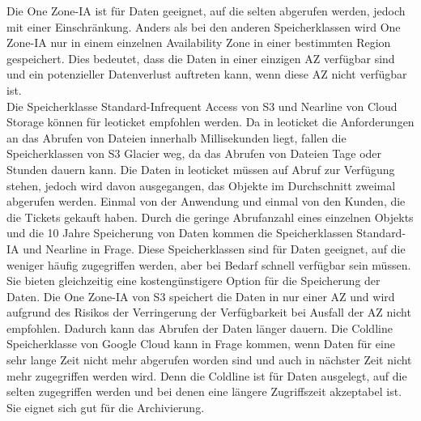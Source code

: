 Die One Zone-IA ist für Daten geeignet, auf die selten abgerufen werden, jedoch mit einer Einschränkung. Anders als bei den anderen Speicherklassen wird One Zone-IA nur in einem einzelnen Availability Zone in einer bestimmten Region gespeichert. Dies bedeutet, dass die Daten in einer einzigen AZ verfügbar sind und ein potenzieller Datenverlust auftreten kann, wenn diese AZ nicht verfügbar ist.\\

Die Speicherklasse Standard-Infrequent Access von S3 und Nearline von Cloud Storage können für leoticket empfohlen werden. Da in leoticket die Anforderungen an das Abrufen von Dateien innerhalb Millisekunden liegt, fallen die Speicherklassen von S3 Glacier weg, da das Abrufen von Dateien Tage oder Stunden dauern kann. Die Daten in leoticket müssen auf Abruf zur Verfügung stehen, jedoch wird davon ausgegangen, das Objekte im Durchschnitt zweimal abgerufen werden. Einmal von der Anwendung und einmal von den Kunden, die die Tickets gekauft haben. Durch die geringe Abrufanzahl eines einzelnen Objekts und die 10 Jahre Speicherung von Daten kommen die Speicherklassen Standard-IA und Nearline in Frage. Diese Speicherklassen sind für Daten geeignet, auf die weniger häufig zugegriffen werden, aber bei Bedarf schnell verfügbar sein müssen. Sie bieten gleichzeitig eine kostengünstigere Option für die Speicherung der Daten. Die One Zone-IA von S3 speichert die Daten in nur einer AZ und wird aufgrund des Risikos der Verringerung der Verfügbarkeit bei Ausfall der AZ nicht empfohlen. Dadurch kann das Abrufen der Daten länger dauern. Die Coldline Speicherklasse von Google Cloud kann in Frage kommen, wenn Daten für eine sehr lange Zeit nicht mehr abgerufen worden sind und auch in nächster Zeit nicht mehr zugegriffen werden wird. Denn die Coldline ist für Daten ausgelegt, auf die selten zugegriffen werden und bei denen eine längere Zugriffszeit akzeptabel ist.  Sie eignet sich gut für die Archivierung.\\

